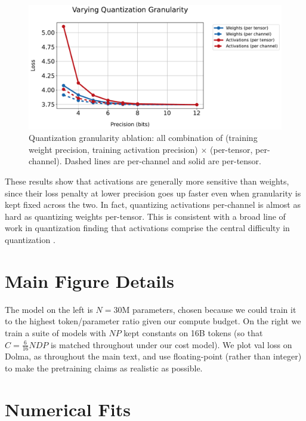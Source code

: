 \documentclass[11pt]{article}
\begin{document}
\begin{figure}
    \centering
    \includegraphics[width=0.85\linewidth]{quantization_granularity.pdf}
    \caption{{Quantization granularity ablation: all combination of (training weight precision, training activation precision) $\times$ (per-tensor, per-channel). Dashed lines are per-channel and solid are per-tensor.}}
    \label{fig:enter-label}
\end{figure}

These results show that activations are generally more sensitive than weights, since their loss penalty at lower precision goes up faster even when granularity is kept fixed across the two. In fact, quantizing activations per-channel is almost as hard as quantizing weights per-tensor. This is consistent with a broad line of work in quantization finding that activations comprise the central difficulty in quantization \citep{dettmers2023case, ma2024era}. 


\section{Main Figure Details}
\label{appdx:main-fig}

The model on the left is $N=30$M parameters, chosen because we could train it to the highest token/parameter ratio given our compute budget. On the right we train a suite of models with $NP$ kept constants on 16B tokens (so that $C = \frac{6}{16}NDP$ is matched throughout under our cost model). We plot val loss on Dolma, as throughout the main text, and use floating-point (rather than integer) to make the pretraining claims as realistic as possible. 

\section{Numerical Fits}
\label{appdx: fits}
\end{document}
